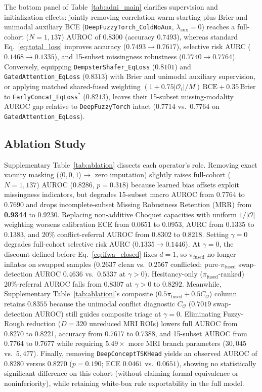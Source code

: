 \documentclass[10pt,twocolumn]{article}
\begin{document}
The bottom panel of Table~\ref{tab:adni_main} clarifies supervision and initialization effects:
jointly removing correlation warm-starting plus Brier and unimodal auxiliary BCE
(\texttt{DeepFuzzyTorch\_ColdNoAux}, $\lambda_{\text{aux}}=0$) reaches a full-cohort
($N=1,137$) AUROC of $0.8300$ (accuracy $0.7493$), whereas standard Eq.~\eqref{eq:total_loss}
improves accuracy ($0.7493 \to 0.7617$), selective risk AURC ($0.1468 \to 0.1335$), and
15-subset missingness robustness ($0.7740 \to 0.7764$). Conversely, equipping
\texttt{DempsterShafer\_EqLoss} ($0.8101$) and \texttt{GatedAttention\_EqLoss} ($0.8313$) with
Brier and unimodal auxiliary supervision, or applying matched shared-fused weighting
$(1+0.75|\mathcal{O}_i|/M)\,\text{BCE}+0.35\,\text{Brier}$ to \texttt{EarlyConcat\_EqLoss}$^*$
($0.8213$), leaves their 15-subset missing-modality AUROC gap relative to
\texttt{DeepFuzzyTorch}
intact ($0.7714$ vs.\ $0.7764$ on \texttt{GatedAttention\_EqLoss}).

\subsection{Ablation Study}
\label{sec:ablation}

Supplementary Table~\ref{tab:ablation} dissects each operator's role. Removing exact vacuity
masking
($\langle 0,0,1\rangle \to$ zero imputation) slightly raises full-cohort ($N=1,137$) AUROC
($0.8286$,
$p=0.318$) because learned bias offsets exploit missingness indicators, but degrades 15-subset
macro AUROC from 0.7764 to 0.7690 and drops incomplete-subset Missing Robustness Retention
(MRR) from \textbf{0.9344} to 0.9230. Replacing non-additive Choquet capacities with uniform
$1/|\mathcal{O}|$ weighting worsens calibration ECE from 0.0651 to 0.0953, AURC from 0.1335 to
0.1383, and 20\%
conflict-referral AUROC from 0.8302 to 0.8218. Setting $\gamma=0$ degrades full-cohort
selective risk AURC ($0.1335 \to 0.1446$). At $\gamma=0$, the discount defined before
Eq.~\eqref{eq:ifwa_closed}
fixes $d=1$, so $\pi_{\text{fused}}$ no longer inflates on swapped samples ($0.2637$ clean
vs.\ $0.2567$ conflicted; pure-$\pi_{\text{fused}}$ swap-detection AUROC $0.4636$ vs.\
$0.5337$ at $\gamma>0$). Hesitancy-only ($\pi_{\text{fused}}$-ranked) 20\%-referral AUROC
falls from $0.8307$ at $\gamma>0$ to $0.8292$. Meanwhile, Supplementary
Table~\ref{tab:ablation}'s
composite ($0.5\pi_{\text{fused}} + 0.5 C_{\mathcal{O}}$) column retains $0.8355$ because
the unimodal conflict diagnostic $C_{\mathcal{O}}$ ($0.7019$ swap-detection AUROC) still guides
composite triage at $\gamma=0$. Eliminating Fuzzy-Rough reduction ($D=320$ unreduced MRI ROIs)
lowers full
AUROC from 0.8270 to 0.8221, accuracy from 0.7617 to 0.7388, and 15-subset AUROC from 0.7764 to
0.7677 while requiring $5.49\times$ more MRI branch parameters ($30,045$ vs.\ $5,477$).
Finally, removing \texttt{DeepConceptTSKHead} yields an observed AUROC of $0.8280$ versus
$0.8270$ ($p=0.190$; ECE $0.0461$ vs.\ $0.0651$), showing no statistically significant
difference on this cohort (without claiming formal equivalence or noninferiority), while
retaining white-box rule exportability in the full model.
\end{document}
